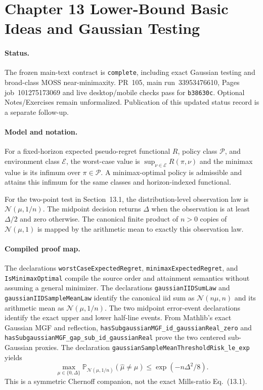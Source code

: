 \section{Chapter 13 Lower-Bound Basic Ideas and Gaussian Testing}

\paragraph{Status.}
The frozen main-text contract is \texttt{complete}, including exact Gaussian
testing and broad-class MOSS near-minimaxity. PR~105, main run~33953476610,
Pages job~101275173069 and live desktop/mobile checks pass for
\texttt{b38630c}. Optional Notes/Exercises remain unformalized.
Publication of this updated status record is a separate follow-up.

\paragraph{Model and notation.}
For a fixed-horizon expected pseudo-regret functional $R$, policy class
$\mathcal P$, and environment class $\mathcal E$, the worst-case value is
$\sup_{\nu\in\mathcal E}R(\pi,\nu)$ and the minimax value is its infimum over
$\pi\in\mathcal P$. A minimax-optimal policy is admissible and attains this
infimum for the same classes and horizon-indexed functional.

For the two-point test in Section~13.1, the distribution-level observation law
is $\mathcal N(\mu,1/n)$. The midpoint decision returns $\Delta$ when the
observation is at least $\Delta/2$ and zero otherwise.
The canonical finite product of $n>0$ copies of $\mathcal N(\mu,1)$ is mapped
by the arithmetic mean to exactly this observation law.

\paragraph{Compiled proof map.}
The declarations \texttt{worstCaseExpectedRegret},
\texttt{minimaxExpectedRegret}, and \texttt{IsMinimaxOptimal} compile the
source order and attainment semantics without assuming a general minimizer.
The declarations \texttt{gaussianIIDSumLaw} and
\texttt{gaussianIIDSampleMeanLaw} identify the canonical iid sum as
$\mathcal N(n\mu,n)$ and its arithmetic mean as $\mathcal N(\mu,1/n)$.
The two midpoint error-event declarations identify the exact upper and lower
half-line events. From Mathlib's exact Gaussian MGF and reflection,
\texttt{hasSubgaussianMGF\_id\_gaussianReal\_zero} and
\texttt{hasSubgaussianMGF\_gap\_sub\_id\_gaussianReal} prove the two
centered sub-Gaussian proxies. The declaration
\texttt{gaussianSampleMeanThresholdRisk\_le\_exp} yields
\[
  \max_{\mu\in\{0,\Delta\}}
  \mathbb P_{\mathcal N(\mu,1/n)}(\widehat\mu\ne\mu)
  \le \exp(-n\Delta^2/8).
\]
This is a symmetric Chernoff companion, not the exact Mills-ratio
Eq.~(13.1).


